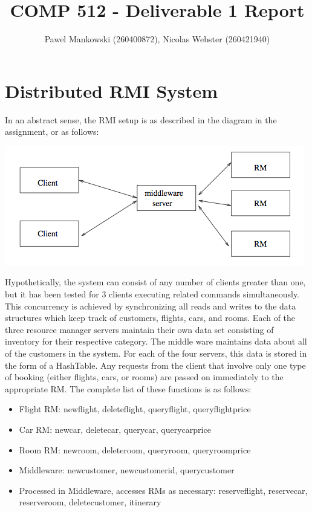 \documentclass[11pt]{amsart}
\title{COMP 512 - Deliverable 1 Report}
\author{Pawel Mankowski (260400872), Nicolas Webster (260421940)}
\begin{document}
\maketitle

\section{Distributed RMI System}

In an abstract sense, the RMI setup is as described in the diagram in the assignment, or as follows:

\begin{center}
\includegraphics[scale=0.8]{images/image1.png}
\end{center}

Hypothetically, the system can consist of any number of clients greater than one, but it has been tested for 3 clients executing related commands
simultaneously. This concurrency is achieved by synchronizing all reads and writes to the data structures which keep track of customers, flights,
cars, and rooms. Each of the three resource manager servers maintain their own data set consisting of inventory for their respective category. The
middle ware maintains data about all of the customers in the system. For each of the four servers,
this data is stored in the form of a HashTable. Any requests from the client that involve only one
type of booking (either flights, cars, or rooms) are passed on immediately to the appropriate RM. The complete list of these functions is as follows:
\begin{itemize}
 	\item Flight RM: newflight, deleteflight, queryflight, queryflightprice
 	\item Car RM: newcar, deletecar, querycar, querycarprice
 	\item Room RM: newroom, deleteroom, queryroom, queryroomprice
 	\item Middleware: newcustomer, newcustomerid, querycustomer
 	\item Processed in Middleware, accesses RMs as necessary: reserveflight, reservecar, reserveroom,
 	deletecustomer, itinerary
\end{itemize}
\end{document}
